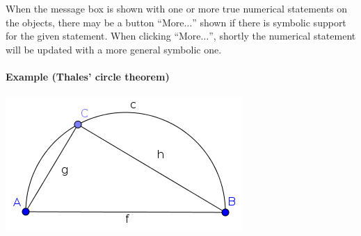 \documentclass{article}
\begin{document}
When the message box is shown with one or more true numerical statements on the objects, there may be a button ``More$\ldots$'' shown if there is symbolic support for the given statement. When clicking ``More$\ldots$'', shortly the numerical statement will be updated with a more general symbolic one.

\paragraph{Example (Thales' circle theorem)}
\begin{center}
\includegraphics[scale=0.5]{Relation-example}
\end{center}
\end{document}
